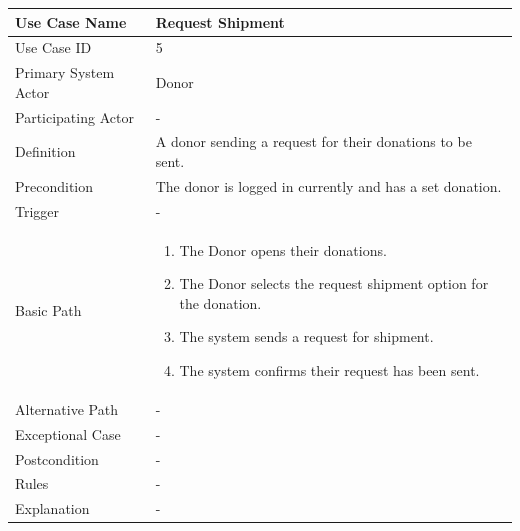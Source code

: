 \documentclass[a4paper,12pt]{report}
\begin{document}
		\begin{tabular}{|m{4cm}|m{11.5cm}|}
			\hline
				Use Case Name & Request Shipment\\
			\hline
				Use Case ID & 5\\
			\hline
				Primary System Actor & Donor\\
			\hline
				Participating Actor & -\\
			\hline
				Definition & A donor sending a request for their donations to be sent.\\
			\hline
				Precondition & The donor is logged in currently and has a set donation.\\
			\hline
				Trigger & -\\
			\hline
				Basic Path & \begin{enumerate}
					\item The Donor opens their donations.
					\item The Donor selects the request shipment option for the donation.
					\item The system sends a request for shipment.
					\item The system confirms their request has been sent.
				\end{enumerate}		
				\\
			\hline
				Alternative Path & -\\
			\hline
				Exceptional Case & -\\
			\hline
				Postcondition & -\\
			\hline
				Rules & -\\
			\hline
				Explanation & -\\
			\hline
		\end{tabular}
\end{document}

